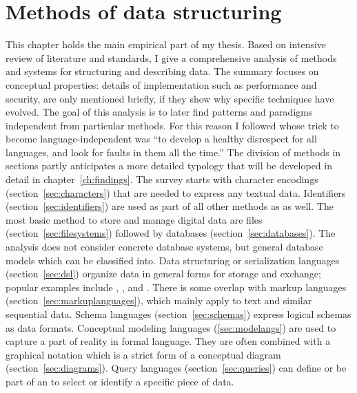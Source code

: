 \chapter{Methods of data structuring}
\label{ch:methods}



This chapter holds the main empirical part of my thesis. Based on intensive
review of literature and standards, I give a comprehensive analysis of methods
and systems for structuring and describing data. The summary focuses on
conceptual properties: details of implementation such as performance and
security, are only mentioned briefly, if they show why specific techniques have
evolved. The goal of this analysis is to later find patterns and paradigms
independent from particular methods. For this reason I followed
\textcite{Meek1995} whose trick to become language-independent was ``to develop
a healthy disrespect for all languages, and look for faults in them all the
time.'' The division of methods in sections partly anticipates a more detailed
typology that will be developed in detail in chapter~\ref{ch:findings}. The
survey starts with character encodings (section~\ref{sec:characters}) that are
needed to express any textual data.  Identifiers
(section~\ref{sec:identifiers}) are used as part of all other methods as as
well. The most basic method to store and manage digital data are files
(section~\ref{sec:filesystems}) followed by databases
(section~\ref{sec:databases}). The analysis does not consider concrete database
systems, but general database models which  can be classified into.  Data
structuring or serialization languages (section~\ref{sec:dsl}) organize data in
general forms for storage and exchange; popular examples include ,
, and . There is some overlap with markup languages
(section~\ref{sec:markuplanguages}), which mainly apply to text and similar
sequential data. Schema languages (section~\ref{sec:schemas}) express logical
schemas as data formats.  Conceptual modeling languages (\ref{sec:modelangs})
are used to capture a part of reality in formal language. They are often
combined with a graphical notation which is a strict form of a conceptual
diagram (section~\ref{sec:diagrams}).  Query languages
(section~\ref{sec:queries}) can define or be part of an  to select or identify a specific piece of data.

